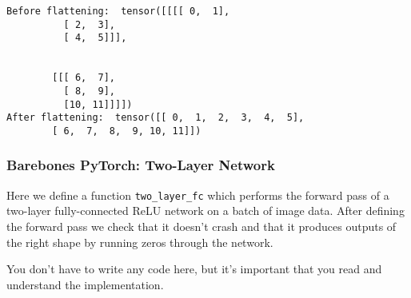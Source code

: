 \documentclass[11pt]{article}
\begin{document}
    \begin{Verbatim}[commandchars=\\\{\}]
Before flattening:  tensor([[[[ 0,  1],
          [ 2,  3],
          [ 4,  5]]],


        [[[ 6,  7],
          [ 8,  9],
          [10, 11]]]])
After flattening:  tensor([[ 0,  1,  2,  3,  4,  5],
        [ 6,  7,  8,  9, 10, 11]])

    \end{Verbatim}

    \subsubsection{Barebones PyTorch: Two-Layer
Network}\label{barebones-pytorch-two-layer-network}

Here we define a function \texttt{two\_layer\_fc} which performs the
forward pass of a two-layer fully-connected ReLU network on a batch of
image data. After defining the forward pass we check that it doesn't
crash and that it produces outputs of the right shape by running zeros
through the network.

You don't have to write any code here, but it's important that you read
and understand the implementation.
\end{document}
